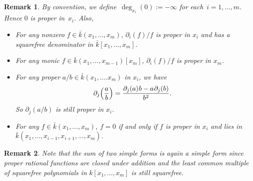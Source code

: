 \documentclass[10pt,a4paper]{amsart}
\newtheorem{remark}{Remark}
\begin{document}
\begin{remark}\label{RMK:proper} 
By convention, we define~$\deg_{x_i}(0) := - \infty$ for each~$i=1,\ldots,m$. Hence $0$ is proper in~$x_i$.  %
Also,
\begin{itemize}
\item For any nonzero $f \in {\bar k}(x_1,\ldots,x_m)$, $\partial_i(f)/f$ is proper in $x_i$ and has a squarefree denominator in ${\bar k}[x_1,\dots,x_m]$.
\item For any monic $f \in {\bar k}(x_1,\ldots,x_{m-1})[x_m]$, $\partial_i(f)/f$ is proper in $x_m$.
\item For any proper $a/b\in {\bar k}(x_1,\ldots.x_m)$ in $x_i$, we have 
\[\partial_j\Big(\frac{a}{b}\Big) =\frac{\partial_j(a)\hskip.5pt b - a\hskip.5pt \partial_j(b)}{b^2}. \]
So $\partial_j(a/b)$ is still proper in $x_i$. %
\item For any $f\in {\bar k}(x_1,\ldots,x_m)$,  $f =0$ if and only if $f$ is proper in $x_i$ and lies in ${\bar k}(x_1,\ldots,x_{i-1},x_{i+1},\ldots,x_m)$.
\end{itemize}
\end{remark}

\begin{remark}\label{RMK:sumsimple}  Note that the sum of two simple forms is again a simple form since proper rational functions are closed under addition and the least common multiple of squarefree polynomials in $k[x_1,\ldots,x_m]$ is still squarefree. 
\end{remark}
\end{document}
